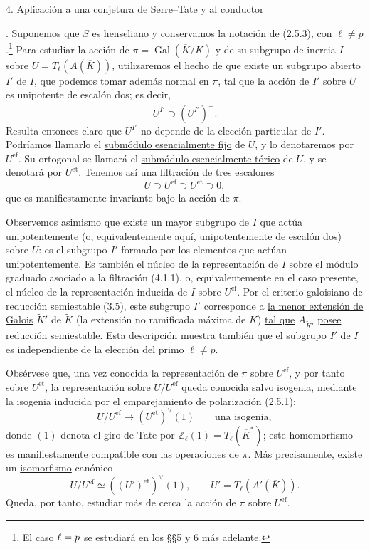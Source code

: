 \par\medskip
\noindent
\underline{4. Aplicación a una conjetura de Serre--Tate y al conductor}

\medskip
{}. Suponemos que $S$ es henseliano y conservamos la notación de
(2.5.3), con $\ell\ne p$.\footnote{El caso
$\ell=p$ se estudiará en los \S\S5 y 6 más adelante.}
Para estudiar la acción de $\pi=\operatorname{Gal}(\overline K/K)$ y
de su subgrupo de inercia $I$ sobre $U=T_\ell(A(\overline K))$,
utilizaremos el hecho de que existe un subgrupo abierto $I'$ de $I$,
que podemos tomar además normal en $\pi$, tal que la acción de $I'$
sobre $U$ es unipotente de escalón dos; es decir,
\[
 U^{I'}\supset (U^{I'})^\perp.
\]
Resulta entonces claro que $U^{I'}$ no depende de la elección particular
de $I'$. Podríamos llamarlo el \underline{submódulo esencialmente fijo}
de $U$, y lo denotaremos por $U^{\mathrm{ef}}$. Su ortogonal se llamará
el \underline{submódulo esencialmente tórico} de $U$, y se denotará por
$U^{\mathrm{et}}$. Tenemos así una filtración de tres escalones
\begin{equation}\tag{4.1.1}
 U\supset U^{\mathrm{ef}}\supset U^{\mathrm{et}}\supset0,
\end{equation}
que es manifiestamente invariante bajo la acción de $\pi$.

Observemos asimismo que existe un mayor subgrupo de $I$ que actúa
unipotentemente (o, equivalentemente aquí, unipotentemente de escalón
dos) sobre $U$: es el subgrupo $I'$ formado por los elementos que actúan
unipotentemente. Es también el núcleo de la representación de $I$ sobre
el módulo graduado asociado a la filtración (4.1.1), o,
equivalentemente en el caso presente, el núcleo de la representación
inducida de $I$ sobre $U^{\mathrm{ef}}$. Por el criterio galoisiano de
reducción semiestable (3.5), este subgrupo $I'$ corresponde a
\underline{la menor extensión de Galois} $\widetilde K'$ de
$\widetilde K$ (la extensión no ramificada máxima de $K$)
\underline{tal que} $A_{\widetilde K'}$ \underline{posee reducción semiestable}.
Esta descripción muestra también que el subgrupo $I'$ de $I$ es
independiente de la elección del primo $\ell\ne p$.

Obsérvese que, una vez conocida la representación de $\pi$ sobre
$U^{\mathrm{ef}}$, y por tanto sobre $U^{\mathrm{et}}$, la
representación sobre $U/U^{\mathrm{ef}}$ queda conocida salvo isogenia,
mediante la isogenia inducida por el emparejamiento de polarización
(2.5.1):
\begin{equation}\tag{4.1.2}
 U/U^{\mathrm{ef}}\longrightarrow (U^{\mathrm{et}})^\vee(1)
 \qquad\text{una isogenia},
\end{equation}
donde $(1)$ denota el giro de Tate por
$\mathbb Z_\ell(1)=T_\ell(\overline K^*)$; este homomorfismo es
manifiestamente compatible con las operaciones de $\pi$. Más
precisamente, existe un \underline{isomorfismo} canónico
\[
 U/U^{\mathrm{ef}}\simeq ((U')^{\mathrm{et}})^\vee(1),
 \qquad U'=T_\ell(A'(\overline K)).
\]
Queda, por tanto, estudiar más de cerca la acción de $\pi$ sobre
$U^{\mathrm{ef}}$.

